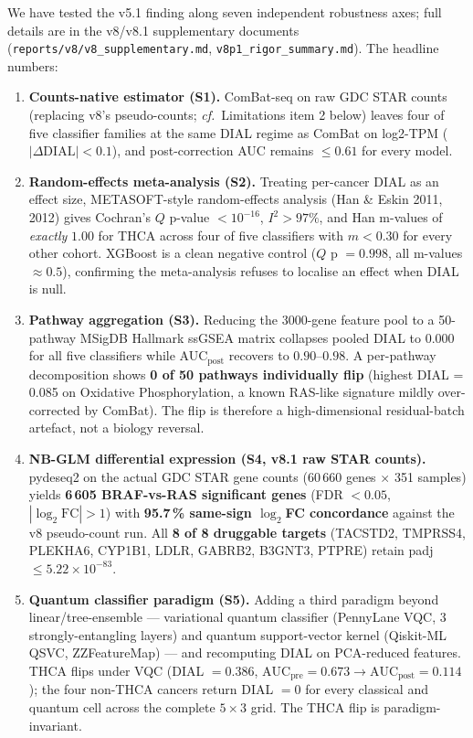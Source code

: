\documentclass[11pt,a4paper]{article}
\begin{document}
We have tested the v5.1 finding along seven independent robustness axes; full details are in the v8/v8.1 supplementary documents (\texttt{reports/v8/v8\_supplementary.md}, \texttt{v8p1\_rigor\_summary.md}). The headline numbers:
\begin{enumerate}
\item \textbf{Counts-native estimator (S1).} ComBat-seq on raw GDC STAR counts (replacing v8's pseudo-counts; \emph{cf.}~Limitations item 2 below) leaves four of five classifier families at the same DIAL regime as ComBat on log2-TPM ($|\Delta\mathrm{DIAL}| < 0.1$), and post-correction AUC remains $\le 0.61$ for every model.
\item \textbf{Random-effects meta-analysis (S2).} Treating per-cancer DIAL as an effect size, METASOFT-style random-effects analysis (Han \& Eskin 2011, 2012) gives Cochran's $Q$ p-value $< 10^{-16}$, $I^2 > 97\%$, and Han m-values of \emph{exactly} $1.00$ for THCA across four of five classifiers with $m < 0.30$ for every other cohort. XGBoost is a clean negative control ($Q$ p $= 0.998$, all m-values $\approx 0.5$), confirming the meta-analysis refuses to localise an effect when DIAL is null.
\item \textbf{Pathway aggregation (S3).} Reducing the 3000-gene feature pool to a 50-pathway MSigDB Hallmark ssGSEA matrix collapses pooled DIAL to $0.000$ for all five classifiers while AUC$_{\mathrm{post}}$ recovers to $0.90$--$0.98$. A per-pathway decomposition shows \textbf{0 of 50 pathways individually flip} (highest DIAL = 0.085 on Oxidative Phosphorylation, a known RAS-like signature mildly over-corrected by ComBat). The flip is therefore a high-dimensional residual-batch artefact, not a biology reversal.
\item \textbf{NB-GLM differential expression (S4, v8.1 raw STAR counts).} pydeseq2 on the actual GDC STAR gene counts (60\,660 genes $\times$ 351 samples) yields \textbf{6\,605 BRAF-vs-RAS significant genes} (FDR $< 0.05$, $|\log_2\mathrm{FC}| > 1$) with \textbf{95.7\,\% same-sign $\log_2$FC concordance} against the v8 pseudo-count run. All \textbf{8 of 8 druggable targets} (TACSTD2, TMPRSS4, PLEKHA6, CYP1B1, LDLR, GABRB2, B3GNT3, PTPRE) retain padj $\le 5.22\times10^{-83}$.
\item \textbf{Quantum classifier paradigm (S5).} Adding a third paradigm beyond linear/tree-ensemble --- variational quantum classifier (PennyLane VQC, 3 strongly-entangling layers) and quantum support-vector kernel (Qiskit-ML QSVC, ZZFeatureMap) --- and recomputing DIAL on PCA-reduced features. THCA flips under VQC (DIAL $= 0.386$, $\mathrm{AUC}_{\mathrm{pre}} = 0.673 \to \mathrm{AUC}_{\mathrm{post}} = 0.114$); the four non-THCA cancers return DIAL $= 0$ for every classical and quantum cell across the complete $5 \times 3$ grid. The THCA flip is paradigm-invariant.

\end{enumerate}
\end{document}
